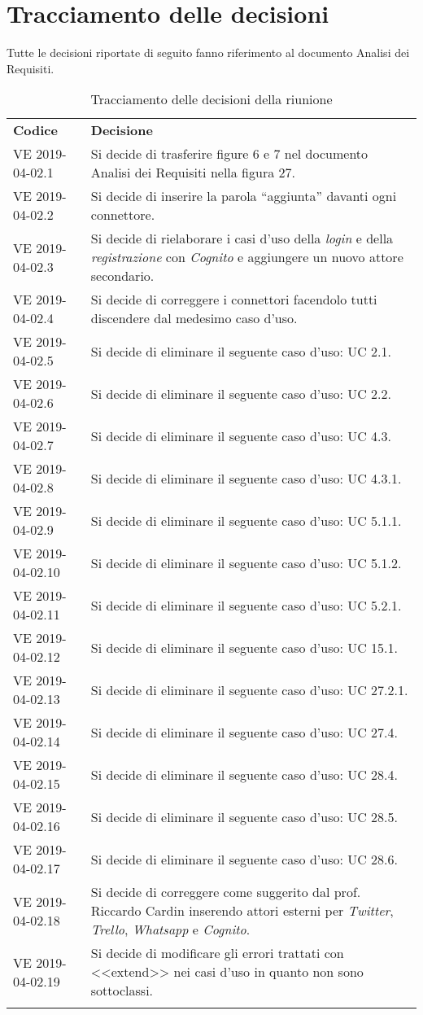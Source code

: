 \clearpage
\section{Tracciamento delle decisioni}
Tutte le decisioni riportate di seguito fanno riferimento al documento Analisi dei Requisiti.
\begin{center}
	\renewcommand{\arraystretch}{1.5}
	\begin{longtable}{  p{3cm} p{11.2cm} }
		\rowcolor{tableHeadYellow}
		\textbf{Codice}&\textbf{Decisione}\\
		VE 2019-04-02.1 & Si decide di trasferire figure 6 e 7 nel documento Analisi dei Requisiti nella figura 27.\\
		VE 2019-04-02.2 & Si decide di inserire la parola “aggiunta” davanti ogni connettore.\\
		VE 2019-04-02.3 & Si decide di rielaborare i casi d'uso della \textit{login} e della \textit{registrazione} con \textit{Cognito} e aggiungere un nuovo attore secondario.\\
		VE 2019-04-02.4 & Si decide di correggere i connettori facendolo tutti discendere dal medesimo caso d'uso.\\
		VE 2019-04-02.5 & Si decide di eliminare il seguente caso d'uso: UC 2.1.\\
		VE 2019-04-02.6 & Si decide di eliminare il seguente caso d'uso: UC 2.2.\\
		VE 2019-04-02.7 & Si decide di eliminare il seguente caso d'uso: UC 4.3.\\
		VE 2019-04-02.8 & Si decide di eliminare il seguente caso d'uso: UC 4.3.1.\\
		VE 2019-04-02.9 & Si decide di eliminare il seguente caso d'uso: UC 5.1.1.\\
		VE 2019-04-02.10 & Si decide di eliminare il seguente caso d'uso: UC 5.1.2.\\
		VE 2019-04-02.11 & Si decide di eliminare il seguente caso d'uso: UC 5.2.1.\\
		VE 2019-04-02.12 & Si decide di eliminare il seguente caso d'uso: UC 15.1.\\
		VE 2019-04-02.13 & Si decide di eliminare il seguente caso d'uso: UC 27.2.1.\\
		VE 2019-04-02.14 & Si decide di eliminare il seguente caso d'uso: UC 27.4.\\
		VE 2019-04-02.15 & Si decide di eliminare il seguente caso d'uso: UC 28.4.\\
		VE 2019-04-02.16 & Si decide di eliminare il seguente caso d'uso: UC 28.5.\\
		VE 2019-04-02.17 & Si decide di eliminare il seguente caso d'uso: UC 28.6.\\
		VE 2019-04-02.18 & Si decide di correggere come suggerito dal prof. Riccardo Cardin inserendo attori esterni per \textit{Twitter}, \textit{Trello}, \textit{Whatsapp} e \textit{Cognito}.\\
		VE 2019-04-02.19 & Si decide di modificare gli errori trattati con <<extend>> nei casi d'uso in quanto non sono sottoclassi.\\
		\rowcolor{white}
		\caption{Tracciamento delle decisioni della riunione}
	\end{longtable}	
\end{center}